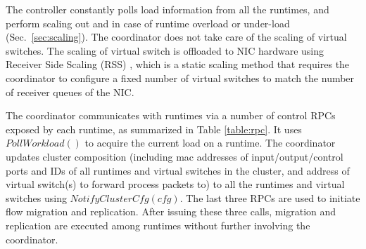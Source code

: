 The controller constantly polls load information from all the runtimes, and perform scaling out and in case of runtime overload or under-load %
(Sec.~\ref{sec:scaling}). The coordinator does not take care of the scaling of virtual switches. The scaling of virtual switch is offloaded to NIC hardware using Receiver Side Scaling (RSS) \cite{rss, jeong2014mtcp}, which is a static scaling method that requires the coordinator to configure a fixed number of virtual switches to match the number of receiver queues of the NIC.  


The coordinator communicates with runtimes via a number of control RPCs exposed by each runtime, as summarized in Table \ref{table:rpc}. It uses $PollWorkload()$ to acquire the current load on a runtime. The coordinator updates cluster composition (including mac addresses of input/output/control ports and IDs of all runtimes and virtual switches in the cluster, and address of virtual switch(s) to forward process packets to) to all the runtimes and virtual switches using $NotifyClusterCfg(cfg)$. 
The last three RPCs are used to initiate flow migration and replication. After issuing these three calls, migration and replication are executed among runtimes without further involving the coordinator. %




